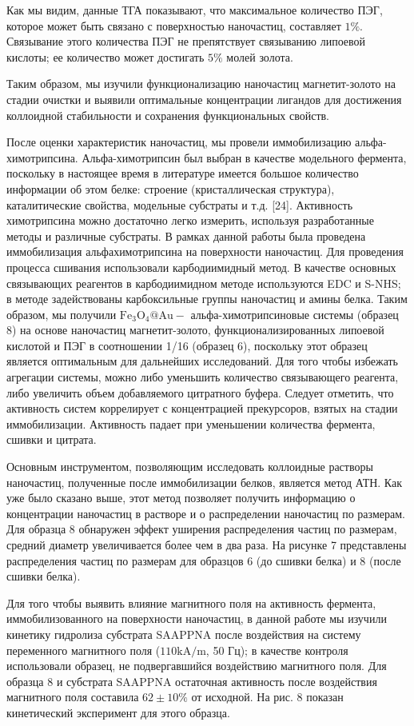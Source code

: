 \documentclass[10pt, a4paper]{article}
\begin{document}
Как мы видим, данные ТГА показывают, что максимальное количество ПЭГ, которое может быть связано с поверхностью наночастиц, составляет \(1 \%\). Связывание этого количества ПЭГ не препятствует связыванию липоевой кислоты; ее количество может достигать \(5 \%\) молей золота.

Таким образом, мы изучили функционализацию наночастиц магнетит-золото на стадии очистки и выявили оптимальные концентрации лигандов для достижения коллоидной стабильности и сохранения функциональных свойств.

После оценки характеристик наночастиц, мы провели иммобилизацию альфа-химотрипсина. Альфа-химотрипсин был выбран в качестве модельного фермента, поскольку в настоящее время в литературе имеется большое количество информации об этом белке: строение (кристаллическая структура), каталитические свойства, модельные субстраты и т.д. [24]. Активность химотрипсина можно достаточно легко измерить, используя разработанные методы и различные субстраты. В рамках данной работы была проведена иммобилизация альфахимотрипсина на поверхности наночастиц. Для проведения процесса сшивания использовали карбодиимидный метод. В качестве основных связывающих реагентов в карбодиимидном методе используются EDC и S-NHS; в методе задействованы карбоксильные группы наночастиц и амины белка. Таким образом, мы получили \(\mathrm{Fe}_{3} \mathrm{O}_{4} @ \mathrm{Au}-\) альфа-химотрипсиновые системы (образец 8) на основе наночастиц магнетит-золото, функционализированных липоевой кислотой и ПЭГ в соотношении 1/16 (образец 6), поскольку этот образец является оптимальным для дальнейших исследований. Для того чтобы избежать агрегации системы, можно либо уменьшить количество связывающего реагента, либо увеличить объем добавляемого цитратного буфера. Следует отметить, что активность систем коррелирует с концентрацией прекурсоров, взятых на стадии иммобилизации. Активность падает при уменьшении количества фермента, сшивки и цитрата.

Основным инструментом, позволяющим исследовать коллоидные растворы наночастиц, полученные после иммобилизации белков, является метод АТН. Как уже было сказано выше, этот метод позволяет получить информацию о концентрации наночастиц в растворе и о распределении наночастиц по размерам. Для образца 8 обнаружен эффект уширения распределения частиц по размерам, средний диаметр увеличивается более чем в два раза. На рисунке 7 представлены распределения частиц по размерам для образцов 6 (до сшивки белка) и 8 (после сшивки белка).

Для того чтобы выявить влияние магнитного поля на активность фермента, иммобилизованного на поверхности наночастиц, в данной работе мы изучили кинетику гидролиза субстрата SAAPPNA после воздействия на систему переменного магнитного поля (\(110 \mathrm{kA} / \mathrm{m}\), 50 Гц); в качестве контроля использовали образец, не подвергавшийся воздействию магнитного поля. Для образца 8 и субстрата SAAPPNA остаточная активность после воздействия магнитного поля составила \(62 \pm 10 \%\) от исходной. На рис. 8 показан кинетический эксперимент для этого образца.
\end{document}

